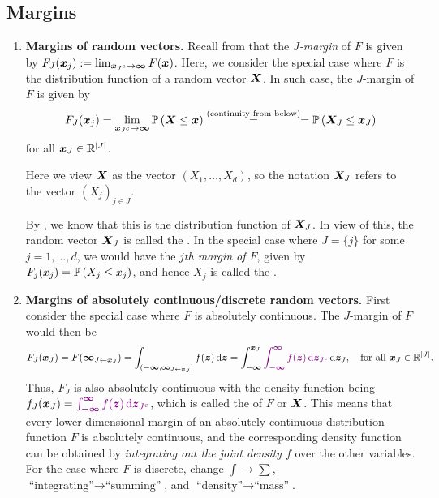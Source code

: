 \subsection{Margins}
\begin{enumerate}
\item \textbf{Margins of random vectors.} Recall from
 that the \emph{\(J\)-margin} of \(F\) is given by
\(F_J(\bm{x}_j):=\lim_{\bm{x}_{J^c}\to\bm{\infty}}F(\bm{x})\).  Here,
we consider the special case where \(F\) is the distribution function of a
random vector \(\bm{X}\). In such case, the \(J\)-margin of \(F\) is given by
\[
F_J(\bm{x}_j)=\lim_{\bm{x}_{J^c}\to\bm{\infty}}\mathbb{P}\left(\bm{X}\le\bm{x}\right)
\overset{\text{(continuity from below)}}{=}
=\mathbb{P}\left(\bm{X}_J\le\bm{x}_J\right)
\]
for all \(\bm{x}_J\in\mathbb{R}^{|J|}\). \begin{note}
Here we view \(\bm{X}\) as the vector \((X_1,\dotsc,X_d)\), so the
notation \(\bm{X}_{J}\) refers to the vector \((X_j)_{j\in J}\).
\end{note}

By , we know that this is the distribution
function of \(\bm{X}_J\). In view of this, the random vector \(\bm{X}_{J}\)
is called the . In the special case where
\(J=\{j\}\) for some \(j=1,\dotsc,d\), we would have the \emph{\(j\)th margin
of \(F\)}, given by \(F_j(x_j)=\mathbb{P}\left(X_j\le x_j\right)\), and hence \(X_j\) is called
the .
\item \textbf{Margins of absolutely continuous/discrete random vectors.}
First consider the special case where \(F\) is absolutely continuous. The
\(J\)-margin of \(F\) would then be
\[
F_J(\vect{x}_J)=F(\vect{\infty}_{J\leftarrow\vect{x}_{J}})
=\int_{(\vect{-\infty},\vect{\infty}_{J\leftarrow\vect{x}_{J}}]}^{}f(\vect{z})\odif{\vect{z}}
=\int_{-\vect{\infty}}^{\vect{x}_{J}}\vc{\int_{\vect{-\infty}}^{\vect{\infty}}f(\vect{z})
\odif{\vect{z}_{J^c}}}\odif{\vect{z}_{J}},
\quad\text{for all \(\vect{x}_{J}\in\R^{|J|}\)}.
\]
Thus, \(F_J\) is also absolutely continuous with the density function being
\(f_J(\vect{x}_J)=\vc{\int_{\vect{-\infty}}^{\vect{\infty}}f(\vect{z})
\odif{\vect{z}_{J^c}}}\), which is called the  of \(F\) or \(\bm{X}\). This means that every lower-dimensional
margin of an absolutely continuous distribution function \(F\) is absolutely
continuous, and the corresponding density function can be obtained by
\emph{integrating out the joint density \(f\)} over the other variables.
For the case where \(F\) is discrete, change \(\int\to\sum\),
\(\text{``integrating''}\to\text{``summing''}\), and
\(\text{``density''}\to\text{``mass''}\).


\end{enumerate}
